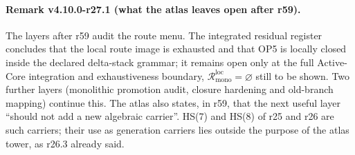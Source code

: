 \paragraph{Remark v4.10.0-r27.1 (what the atlas leaves open after r59).}
The layers after r59 audit the route menu.  The integrated residual register concludes that the local route image is exhausted and that
OP5 is locally closed inside the declared delta-stack grammar; it remains open only at the full Active-Core integration and exhaustiveness
boundary, \(\mathcal R^{\mathrm{loc}}_{\mathrm{mono}}=\varnothing\) still to be shown.  Two further layers (monolithic promotion audit, closure
hardening and old-branch mapping) continue this.  The atlas also states, in r59, that the next useful layer ``should not add a new algebraic
carrier''.  HS(7) and HS(8) of r25 and r26 are such carriers; their use as generation carriers lies outside the purpose of the atlas
tower, as r26.3 already said.

